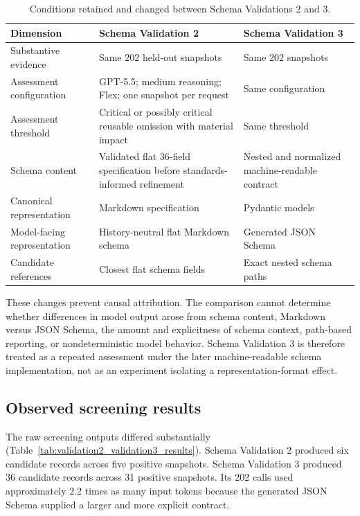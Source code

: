 \documentclass{article}
\begin{document}
\begin{table}[H]
    \centering
    \caption{Conditions retained and changed between Schema Validations 2 and 3.}
    \label{tab:validation2_validation3_design}
    \renewcommand{\arraystretch}{1.15}
    \small
    \begin{tabularx}{\textwidth}{>{\RaggedRight\arraybackslash}p{} >{\RaggedRight\arraybackslash}X >{\RaggedRight\arraybackslash}X}
        \toprule
        \textbf{Dimension} & \textbf{Schema Validation 2} & \textbf{Schema Validation 3} \\
        \midrule
        Substantive evidence & Same 202 held-out snapshots & Same 202 snapshots \\
        Assessment configuration & GPT-5.5; medium reasoning; Flex; one snapshot per request & Same configuration \\
        Assessment threshold & Critical or possibly critical reusable omission with material impact & Same threshold \\
        Schema content & Validated flat 36-field specification before standards-informed refinement & Nested and normalized machine-readable contract \\
        Canonical representation & Markdown specification & Pydantic models \\
        Model-facing representation & History-neutral flat Markdown schema & Generated JSON Schema \\
        Candidate references & Closest flat schema fields & Exact nested schema paths \\
        \bottomrule
    \end{tabularx}
\end{table}

These changes prevent causal attribution. The comparison cannot determine whether differences in model output arose from schema content, Markdown versus JSON Schema, the amount and explicitness of schema context, path-based reporting, or nondeterministic model behavior. Schema Validation 3 is therefore treated as a repeated assessment under the later machine-readable schema implementation, not as an experiment isolating a representation-format effect.

\subsection{Observed screening results}

The raw screening outputs differed substantially (Table~\ref{tab:validation2_validation3_results}). Schema Validation 2 produced six candidate records across five positive snapshots. Schema Validation 3 produced 36 candidate records across 31 positive snapshots. Its 202 calls used approximately 2.2 times as many input tokens because the generated JSON Schema supplied a larger and more explicit contract.
\end{document}
